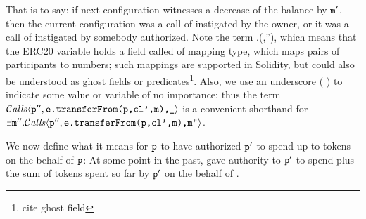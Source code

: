 \noindent
That is to say: if next configuration witnesses a decrease of the balance by
 ${\mbox{\tt{m}}}'$, then the current configuration was a call of  instigated by
 the owner, or it was a call of  instigated by somebody authorized.
Note the term .(,''), which means that the
ERC20 variable  holds a field called  of   mapping type, which maps pairs of participants to numbers; such
mappings are supported in Solidity\cite{Solidity}, but could also be
 understood as ghost fields or predicates\footnote{cite ghost
 field}.
Also, %
we use an underscore ($\_$) to indicate some value or variable of no importance; thus the term ${\mathcal{C}}\textrm{\textit{alls}}\langle {\mbox{\tt{p}}}'',{\mbox{\tt{e.transferFrom(p,cl',m),\_}}}\rangle$ is a convenient shorthand for 
$\exists {\mbox{\tt{m}}}''.{\mathcal{C}}\textrm{\textit{alls}}\langle {\mbox{\tt{p}}}'',{\mbox{\tt{e.transferFrom(p,cl',m),m''}}}\rangle$. 

We now define what it means for ${\mbox{\tt{p}}}$ to have authorized ${\mbox{\tt{p}}}'$ to  spend 
up to  tokens on the behalf of ${\mbox{\tt{p}}}$: At some point in the
past,   gave authority to ${\mbox{\tt{p}}}'$  to spend   
plus the sum of  tokens
spent so far by ${\mbox{\tt{p}}}' $ on the behalf of . 

